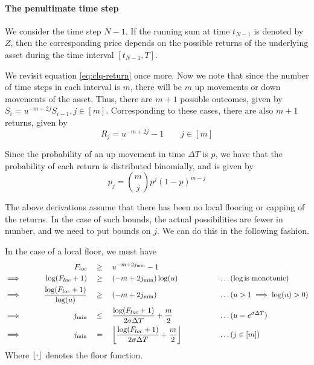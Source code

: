 \paragraph{The penultimate time step}

We consider the time step $ N - 1 $. If the running sum at time $ t_{N - 1} $ is denoted by $ Z $, then the corresponding price depends on the possible returns of the underlying asset during the time interval $ [ t_{N - 1}, T ] $.

We revisit equation \ref{eq:clq-return} once more. Now we note that since the number of time steps in each interval is $m$, there will be $m$ up movements or down movements of the asset. Thus, there are $ m + 1 $ possible outcomes, given by $ S_i = u^{-m + 2j} S_{i-1}, j \in [m] $. Corresponding to these cases, there are also $ m + 1 $ returns, given by
\begin{equation}
	\label{eq:clq-return-final}
	R_j = u^{-m + 2j} - 1 \qquad j \in [m]
\end{equation}

Since the probability of an up movement in time $ \Delta T $ is $p$, we have that the probability of each return is distributed binomially, and is given by
\begin{equation}
	\label{eq:clq-prb-binom}
	p_j = \binom{m}{j} p^j (1-p)^{m-j}
\end{equation}

The above derivations assume that there has been no local flooring or capping of the returns. In the case of such bounds, the actual possibilities are fewer in number, and we need to put bounds on $j$. We can do this in the following fashion.

In the case of a local floor, we must have
\begin{alignat*}{9}
	                 &&  F_{loc}  \quad & \ge \quad  u^{ -m + 2 j_{\min} } - 1 && \\
	\implies  \qquad &&  \log(F_{loc} + 1)  \quad & \ge \quad  ( -m + 2 j_{\min} ) \log(u)  &&  \qquad \qquad \dots (\log \text{is monotonic}) \\
	\implies  \qquad &&  \frac{\log(F_{loc} + 1)}{\log(u)}  \quad & \ge \quad  ( -m + 2 j_{\min} )  &&  \qquad \qquad \dots (u > 1 \implies \log(u) > 0) \\
	\implies  \qquad &&  j_{\min}  \quad & \le \quad  \frac{ \log(F_{loc} + 1) }{ 2 \sigma \Delta T } + \frac{m}{2}  &&  \qquad \qquad \dots (u = e^{ \sigma \Delta T }) \\
	\implies  \qquad &&  j_{\min}  \quad & = \quad  \left\lfloor \frac{ \log(F_{loc} + 1) }{ 2 \sigma \Delta T } + \frac{m}{2} \right\rfloor  &&  \qquad \qquad \dots (j \in [m]) \\
\end{alignat*}
Where $ \left\lfloor\cdot\right\rfloor $ denotes the floor function.

